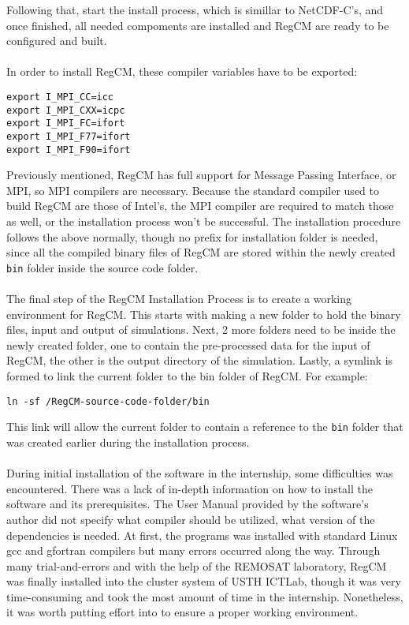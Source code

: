Following that, start the install process, which is simillar to NetCDF-C's, and once finished, all needed compoments are installed and RegCM are ready to be configured and built. \\
~\\
In order to install RegCM, these compiler variables have to be exported:
\begin{center}
\begin{BVerbatim}
export I_MPI_CC=icc
export I_MPI_CXX=icpc
export I_MPI_FC=ifort
export I_MPI_F77=ifort
export I_MPI_F90=ifort
\end{BVerbatim}
\end{center}
Previously mentioned, RegCM has full support for Message Passing Interface, or MPI, so MPI compilers are necessary. Because the standard compiler used to build RegCM are those of Intel's, the MPI compiler are required to match those as well, or the installation process won't be successful. The installation procedure follows the above normally, though no prefix for installation folder is needed, since all the compiled binary files of RegCM are stored within the newly created \verb|bin| folder inside the source code folder. \\
~\\
The final step of the RegCM Installation Process is to create a working environment for RegCM. This starts with making a new folder to hold the binary files, input and output of simulations. Next, 2 more folders need to be inside the newly created folder, one to contain the pre-processed data for the input of RegCM, the other is the output directory of the simulation. Lastly, a symlink is formed to link the current folder to the bin folder of RegCM. For example:
\begin{center}
\begin{BVerbatim}
ln -sf /RegCM-source-code-folder/bin
\end{BVerbatim}
\end{center}
This link will allow the current folder to contain a reference to the \verb|bin| folder that was created earlier during the installation process. \\
~\\
During initial installation of the software in the internship, some difficulties was encountered. There was a lack of in-depth information on how to install the software and its prerequisites. The User Manual provided by the software's author did not specify what compiler should be utilized, what version of the dependencies is needed. At first, the programs was installed with standard Linux gcc and gfortran compilers but many errors occurred along the way. Through many trial-and-errors and with the help of the REMOSAT laboratory, RegCM was finally installed into the cluster system of USTH ICTLab, though it was very time-consuming and took the most amount of time in the internship. Nonetheless, it was worth putting effort into to ensure a proper working environment. \\

